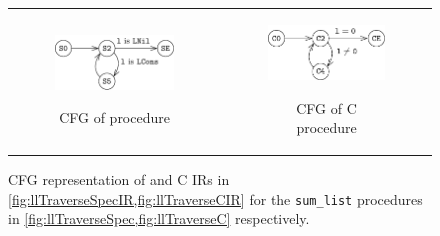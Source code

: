 \begin{figure}
\begin{tabular}{@{}c@{}c@{}}
\begin{subfigure}[b]{0.5\textwidth}
\begin{center}
{\includegraphics[scale=1.4]{chapters/figures/figSumListSpecCfg.pdf}}
\end{center}
\caption{\label{fig:llTraverseSpecCFG}CFG of \SpecL{} procedure}
\end{subfigure}%
&
\begin{subfigure}[b]{0.5\textwidth}
\begin{center}
{\includegraphics[scale=1.4]{chapters/figures/figSumListCCfg.pdf}}
\end{center}
\caption{\label{fig:llTraverseCCFG}CFG of C procedure}
\end{subfigure}%
\\
\end{tabular}
\caption{\label{fig:llTraverseSpecAndCCFG}CFG representation of \SpecL{} and C IRs in \cref{fig:llTraverseSpecIR,fig:llTraverseCIR} for the {\tt sum\_list} procedures in \cref{fig:llTraverseSpec,fig:llTraverseC} respectively.}
\end{figure}

